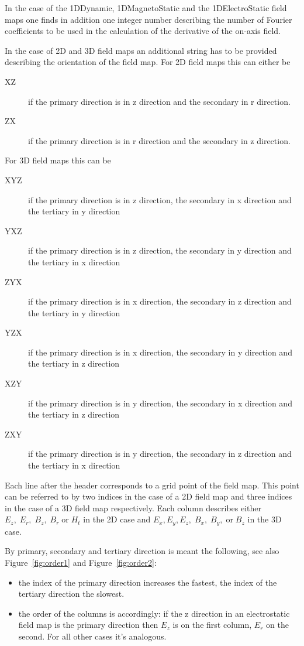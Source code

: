 In the case of the 1DDynamic, 1DMagnetoStatic and the 1DElectroStatic field maps one finds in addition one integer number describing the number of Fourier coefficients to be used in the calculation of the derivative of the on-axis field. 

In the case of 2D and 3D field maps an additional string has to be provided describing the orientation of the field map. For 2D field maps this can either be 
\begin{description}
\item[XZ]
if the primary direction is in z direction and the secondary in r direction.
\item[ZX]
if the primary direction is in r direction and the secondary in z direction.
\end{description}
For 3D field maps this can be
\begin{description}
\item[XYZ]
if the primary direction is in z direction, the secondary in x direction and the tertiary in y direction
\item[YXZ]
if the primary direction is in z direction, the secondary in y direction and the tertiary in x direction
\item[ZYX]
if the primary direction is in x direction, the secondary in z direction and the tertiary in y direction
\item[YZX]
if the primary direction is in x direction, the secondary in y direction and the tertiary in z direction
\item[XZY]
if the primary direction is in y direction, the secondary in x direction and the tertiary in z direction
\item[ZXY]
if the primary direction is in y direction, the secondary in z direction and the tertiary in x direction
\end{description}

Each line after the header corresponds to a grid point of the field map. This point can be referred to by two indices in the case of a 2D field map and three indices in the case of a 3D field map respectively. Each column describes either $E_z,\; E_r,\; B_z,\; B_r\; \text{or}\;H_t$ in the 2D case and $E_x, E_y, E_z,\; B_x,\; B_y,\;\text{or}\; B_z$ in the 3D case.

By primary, secondary and tertiary direction is meant the following, see also Figure~\ref{fig:order1} and Figure~\ref{fig:order2}:
\begin{itemize}
\item
the index of the primary direction increases the fastest, the index of the tertiary direction the slowest. 
\item
the order of the columns is accordingly: if the z direction in an electrostatic field map is the primary direction then $E_z$ is on the first column, $E_r$ on the second. For all other cases it's analogous.
\end{itemize}

